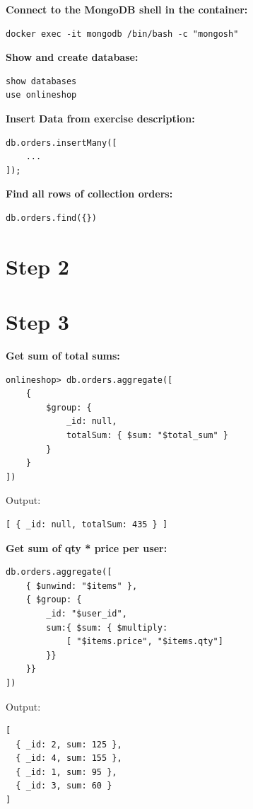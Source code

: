 \documentclass[14pt,a4paper]{extarticle}
\begin{document}
	\noindent \textbf{Connect to the MongoDB shell in the container:}
	\begin{lstlisting}[style=fish]
docker exec -it mongodb /bin/bash -c "mongosh"
	\end{lstlisting}

	\noindent \textbf{Show and create database:}
	\begin{lstlisting}[style=fish]
show databases
use onlineshop
	\end{lstlisting}

	\noindent \textbf{Insert Data from exercise description:}
	\begin{lstlisting}[style=fish]
db.orders.insertMany([
	...
]);
	\end{lstlisting}

	\noindent \textbf{Find all rows of collection orders:}
	\begin{lstlisting}[style=fish]
db.orders.find({})
	\end{lstlisting}

	\newpage
	\section*{Step 2}

	\newpage
	\section*{Step 3}

	\noindent \textbf{Get sum of total sums:}
	\begin{lstlisting}[style=fish]
onlineshop> db.orders.aggregate([
	{
		$group: {
			_id: null, 
			totalSum: { $sum: "$total_sum" } 
		}
	}  
])
	\end{lstlisting}
	\noindent Output:
	\begin{lstlisting}[style=fish]
[ { _id: null, totalSum: 435 } ]
	\end{lstlisting}

	\vspace{1cm}

	\noindent \textbf{Get sum of qty * price per user:}
	\begin{lstlisting}[style=fish]
db.orders.aggregate([ 
	{ $unwind: "$items" }, 
	{ $group: { 
		_id: "$user_id", 
		sum:{ $sum: { $multiply: 
			[ "$items.price", "$items.qty"] 
		}}
	}}
])
	\end{lstlisting}
	\noindent Output:
	\begin{lstlisting}[style=fish]
[
  { _id: 2, sum: 125 },
  { _id: 4, sum: 155 },
  { _id: 1, sum: 95 },
  { _id: 3, sum: 60 }
]
	\end{lstlisting}
\end{document}
